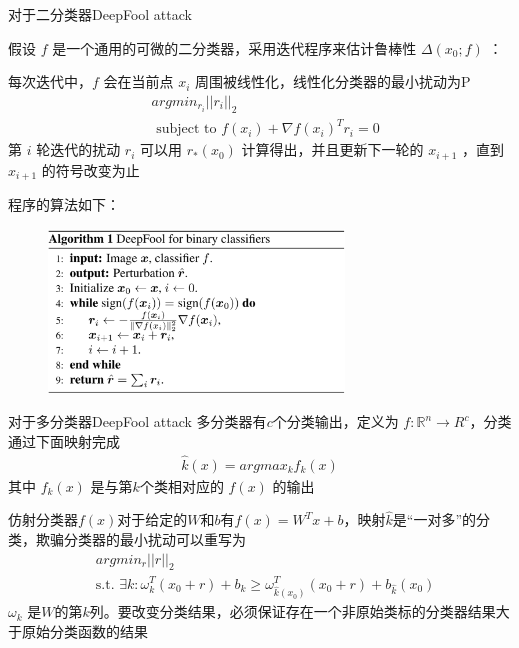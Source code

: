 \begin{frame}{对于二分类器DeepFool attack}
    \begin{multicols}{2}
        假设 $f$ 是一个通用的可微的二分类器，采用迭代程序来估计鲁棒性 $\Delta(x_0;f)$ ：

        每次迭代中，$f$ 会在当前点 $x_i$ 周围被线性化，线性化分类器的最小扰动为P
        \begin{equation}
            \begin{aligned}
                & argmin_{r_i} ||r_i||_2 \\
                & \text{ subject to } f(x_i)+\nabla f(x_i)^T r_i=0
            \end{aligned}
        \end{equation}
        第 $i$ 轮迭代的扰动 $r_i$ 可以用 $r_*(x_0)$ 计算得出，并且更新下一轮的 $x_{i+1}$ ，直到 $x_{i+1}$ 的符号改变为止

        程序的算法如下：
        \begin{figure}
            \centering
            \includegraphics[width=0.7\textwidth]{docs/paperReading/deepfool/deepfool-algorithm_1.png}
        \end{figure}
    \end{multicols}
\end{frame}

\begin{frame}{对于多分类器DeepFool attack}
    多分类器有$c$个分类输出，定义为 $f:\mathbb{R}^n\rightarrow R^c$，分类通过下面映射完成
    \begin{equation}
        \begin{aligned}
            \hat{k}(x)=argmax_{k} f_k(x)
        \end{aligned}
    \end{equation}
    其中 $f_k(x)$ 是与第$k$个类相对应的 $f(x)$ 的输出

    仿射分类器$f(x)$对于给定的$W$和$b$有$f(x)=W^Tx+b$，映射$\hat{k}$是“一对多”的分类，欺骗分类器的最小扰动可以重写为
    \begin{equation}
        \begin{aligned}
            & argmin_{r} ||r||_2 \\
            & \text{s.t. } \exists k:\omega_k^T (x_0+r)+b_k\geq \omega_{\hat{k}(x_0)}^T(x_0+r)+b_{\hat{k}}(x_0)
        \end{aligned}
    \end{equation}
    $\omega_k$ 是$W$的第$k$列。要改变分类结果，必须保证存在一个非原始类标的分类器结果大于原始分类函数的结果
\end{frame}



